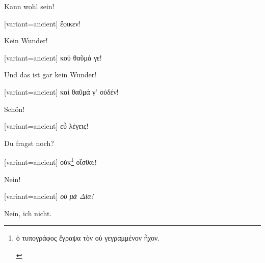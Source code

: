 Kann wohl sein! 

\switchcolumn

\begin{greek}[variant=ancient]%
ἕοικεν!

\end{greek}%
\switchcolumn*

Kein Wunder! 

\switchcolumn

\begin{greek}[variant=ancient]%
κοὐ θαῦμά γε!

\end{greek}%
\switchcolumn*

Und das ist gar kein Wunder! 

\switchcolumn

\begin{greek}[variant=ancient]%
καὶ θαῦμά γ' οὐδέν!

\end{greek}%
\switchcolumn*

Schön! 

\switchcolumn

\begin{greek}[variant=ancient]%
εὖ λέγεις!

\end{greek}%
\switchcolumn*

Du fragst noch? 

\switchcolumn

\begin{greek}[variant=ancient]%
οὐκ\footnote{\begin{latin}%
\textgreek[variant=ancient]{ὁ τυπογράφος ἔγραψα τὸν οὐ γεγραμμένον
ἦχον.}\end{latin}%
} οἶσθα;!

\end{greek}%
Nein! 

\switchcolumn

\begin{greek}[variant=ancient]%
\emph{οὐ μὰ Δία!}

\end{greek}%
\switchcolumn*

Nein, ich nicht. 

\switchcolumn

